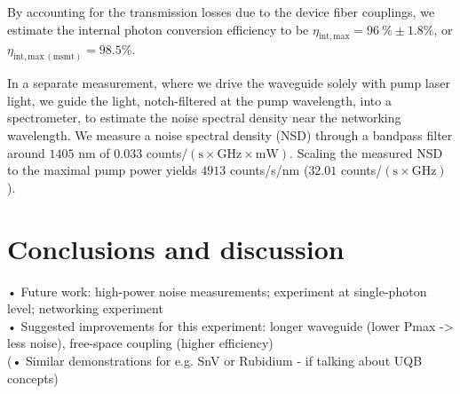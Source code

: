 \documentclass[floatfix,reprint,superscriptaddress,amsmath,amssymb,aps]{revtex4-2}
\begin{document}
By accounting for the transmission losses due to the device fiber couplings, we estimate the internal photon conversion efficiency to be $\eta_{\mathrm{int},\mathrm{max}} = 96\ \% \pm 1.8 \%$, or $\eta_{\mathrm{int},\mathrm{max\,(msmt)}} = 98.5 \%$.
\par
In a separate measurement, where we drive the waveguide solely with pump laser light, we guide the light, notch-filtered at the pump wavelength, into a spectrometer, to estimate the noise spectral density near the networking wavelength. We measure a noise spectral density (NSD) through a bandpass filter around $1405$ nm of $0.033$ counts$/(\mathrm{s} \times \mathrm{GHz} \times \mathrm{mW})$. Scaling the measured NSD to the maximal pump power yields $4913$ counts/s/nm ($32.01$ counts/$(\mathrm{s} \times \mathrm{GHz})$). 
\\
\section{Conclusions and discussion}
• Future work: high-power noise measurements; experiment at single-photon level; networking experiment
\\
• Suggested improvements for this experiment: longer waveguide (lower Pmax -> less noise), free-space coupling (higher efficiency)
\\
(• Similar demonstrations for e.g. SnV or Rubidium - if talking about UQB concepts)

\end{document}
